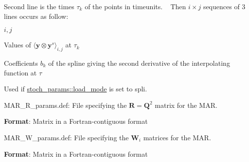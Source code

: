 \begin{DoxyItemize}
\begin{DoxyItemize}
 Second line is the times $\tau_k$ of the points in timeunits. ~\newline
 Then $i\times j$ sequences of 3 lines occurs as follow\+:
\begin{DoxyEnumerate}
\item $i,j$
\item Values of $\langle \boldsymbol y \otimes \boldsymbol y^s \rangle_{i,j}$ at $\tau_k$
\item Coefficients $b_k$ of the spline giving the second derivative of the interpolating function at $\tau$
\end{DoxyEnumerate}
\item Used if \hyperlink{namespacestoch__params_ac61a48744a1bb015b5148c421837fbe7}{stoch\+\_\+params\+::load\+\_\+mode} is set to \textquotesingle{}spli\textquotesingle{}.
\end{DoxyItemize}
\item \textquotesingle{}M\+A\+R\+\_\+\+R\+\_\+params.\+def\textquotesingle{}\+: File specifying the $\boldsymbol R = \boldsymbol Q^2$ matrix for the M\+AR.
\begin{DoxyItemize}
\item {\bfseries Format}\+: Matrix in a Fortran-\/contiguous format
\end{DoxyItemize}
\item \textquotesingle{}M\+A\+R\+\_\+\+W\+\_\+params.\+def\textquotesingle{}\+: File specifying the $\boldsymbol W_i$ matrices for the M\+AR.
\begin{DoxyItemize}
\item {\bfseries Format}\+: Matrix in a Fortran-\/contiguous format 
\end{DoxyItemize}
\end{DoxyItemize}
